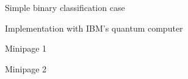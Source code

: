 \documentclass[10pt]{beamer}
\begin{document}
{\begin{frame}{Simple binary classification case}

\end{frame}
}

{
\begin{frame}{Implementation with IBM's quantum computer}

\begin{minipage}[c]{.4\textwidth}
Minipage 1
\end{minipage}%
\begin{minipage}[c][][b]{.6\textwidth}
Minipage 2
\end{minipage}


\end{frame}
}
\end{document}
